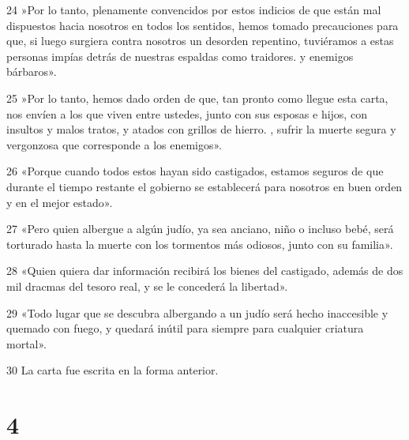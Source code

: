 \par 24 »Por lo tanto, plenamente convencidos por estos indicios de que están mal dispuestos hacia nosotros en todos los sentidos, hemos tomado precauciones para que, si luego surgiera contra nosotros un desorden repentino, tuviéramos a estas personas impías detrás de nuestras espaldas como traidores. y enemigos bárbaros».
\par 25 »Por lo tanto, hemos dado orden de que, tan pronto como llegue esta carta, nos envíen a los que viven entre ustedes, junto con sus esposas e hijos, con insultos y malos tratos, y atados con grillos de hierro. , sufrir la muerte segura y vergonzosa que corresponde a los enemigos».
\par 26 «Porque cuando todos estos hayan sido castigados, estamos seguros de que durante el tiempo restante el gobierno se establecerá para nosotros en buen orden y en el mejor estado».
\par 27 «Pero quien albergue a algún judío, ya sea anciano, niño o incluso bebé, será torturado hasta la muerte con los tormentos más odiosos, junto con su familia».
\par 28 «Quien quiera dar información recibirá los bienes del castigado, además de dos mil dracmas del tesoro real, y se le concederá la libertad».
\par 29 «Todo lugar que se descubra albergando a un judío será hecho inaccesible y quemado con fuego, y quedará inútil para siempre para cualquier criatura mortal».
\par 30 La carta fue escrita en la forma anterior.

\chapter{4}

